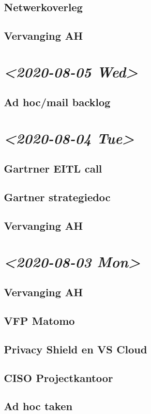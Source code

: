 \documentclass[11pt]{article}
\begin{document}
\subsection{Netwerkoverleg}
\label{sec:orgc1e901f}
\subsection{Vervanging AH}
\label{sec:org08a0b12}
\section{\textit{<2020-08-05 Wed>}}
\label{sec:org8a7a3d2}
\subsection{Ad hoc/mail backlog}
\label{sec:org05606fb}
\section{\textit{<2020-08-04 Tue>}}
\label{sec:org17bc205}
\subsection{Gartrner EITL call}
\label{sec:org3a20f11}
\subsection{Gartner strategiedoc}
\label{sec:orgfb9ea5c}
\subsection{Vervanging AH}
\label{sec:orgfa9219e}
\section{\textit{<2020-08-03 Mon>}}
\label{sec:orgd1b039e}
\subsection{Vervanging AH}
\label{sec:orgc9d30cb}
\subsection{VFP Matomo}
\label{sec:org54c346e}
\subsection{Privacy Shield en VS Cloud}
\label{sec:org086c5cc}
\subsection{CISO Projectkantoor}
\label{sec:org84271ba}
\subsection{Ad hoc taken}
\label{sec:org493e0e9}
\end{document}
